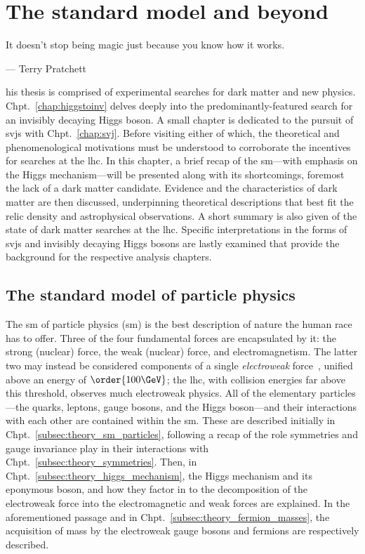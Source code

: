 \chapter{The standard model and beyond}
\label{chap:theory}

\epigraph{It doesn’t stop being magic just because you know how it works.}{--- Terry Pratchett}

his thesis is comprised of experimental searches for dark matter and new physics. Chpt.~\ref{chap:higgstoinv} delves deeply into the predominantly-featured search for an invisibly decaying Higgs boson. A small chapter is dedicated to the pursuit of \glspl{svj} with Chpt.~\ref{chap:svj}. Before visiting either of which, the theoretical and phenomenological motivations must be understood to corroborate the incentives for searches at the \acrlong{lhc}. In this chapter, a brief recap of the \acrlong{sm}---with emphasis on the Higgs mechanism---will be presented along with its shortcomings, foremost the lack of a dark matter candidate. Evidence and the characteristics of dark matter are then discussed, underpinning theoretical descriptions that best fit the relic density and astrophysical observations. A short summary is also given of the state of dark matter searches at the \acrshort{lhc}. Specific interpretations in the forms of \glspl{svj} and invisibly decaying Higgs bosons are lastly examined that provide the background for the respective analysis chapters.




\section{The standard model of particle physics}
\label{sec:theory_standardmodel}

The \acrlong{sm} of particle physics (\acrshort{sm}) is the best description of nature the human race has to offer. Three of the four fundamental forces are encapsulated by it: the strong (nuclear) force, the weak (nuclear) force, and electromagnetism. The latter two may instead be considered components of a single \emph{electroweak} force~\cite{GLASHOW1961579,PhysRevLett.19.1264,Salam:1968rm}, unified above an energy of $\order{\text{100}\GeV}$; the \acrshort{lhc}, with collision energies far above this threshold, observes much electroweak physics. All of the elementary particles---the quarks, leptons, gauge bosons, and the Higgs boson---and their interactions with each other are contained within the \acrlong{sm}. These are described initially in Chpt.~\ref{subsec:theory_sm_particles}, following a recap of the role symmetries and gauge invariance play in their interactions with Chpt.~\ref{subsec:theory_symmetries}. Then, in Chpt.~\ref{subsec:theory_higgs_mechanism}, the Higgs mechanism and its eponymous boson, and how they factor in to the decomposition of the electroweak force into the electromagnetic and weak forces are explained. In the aforementioned passage and in Chpt.~\ref{subsec:theory_fermion_masses}, the acquisition of mass by the electroweak gauge bosons and fermions are respectively described.


